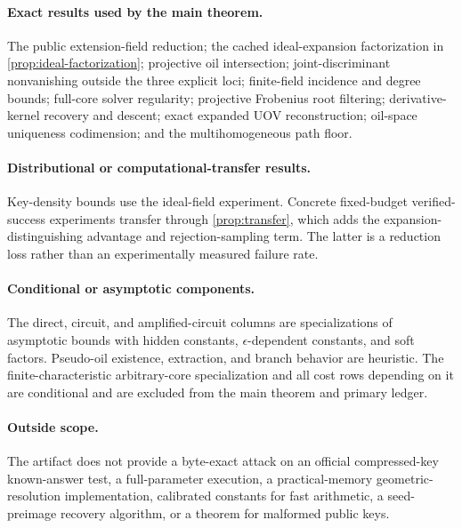 \documentclass[10pt,a4paper]{article}
\begin{document}
\paragraph{Exact results used by the main theorem.}
The public extension-field reduction; the cached ideal-expansion factorization in \cref{prop:ideal-factorization}; projective oil intersection; joint-discriminant nonvanishing outside the three explicit loci; finite-field incidence and degree bounds; full-core solver regularity; projective Frobenius root filtering; derivative-kernel recovery and descent; exact expanded UOV reconstruction; oil-space uniqueness codimension; and the multihomogeneous path floor.

\paragraph{Distributional or computational-transfer results.}
Key-density bounds use the ideal-field experiment.  Concrete fixed-budget verified-success experiments transfer through \cref{prop:transfer}, which adds the expansion-distinguishing advantage and rejection-sampling term.  The latter is a reduction loss rather than an experimentally measured failure rate.

\paragraph{Conditional or asymptotic components.}
The direct, circuit, and amplified-circuit columns are specializations of asymptotic bounds with hidden constants, $\epsilon$-dependent constants, and soft factors.  Pseudo-oil existence, extraction, and branch behavior are heuristic.  The finite-characteristic arbitrary-core specialization and all cost rows depending on it are conditional and are excluded from the main theorem and primary ledger.

\paragraph{Outside scope.}
The artifact does not provide a byte-exact attack on an official compressed-key known-answer test, a full-parameter execution, a practical-memory geometric-resolution implementation, calibrated constants for fast arithmetic, a seed-preimage recovery algorithm, or a theorem for malformed public keys.
\end{document}

